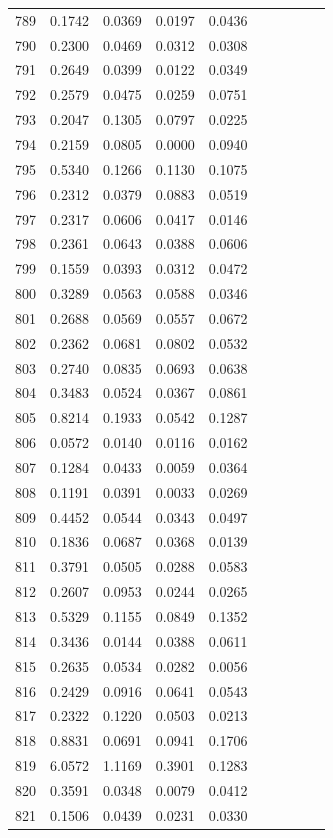 \begin{table}
\begin{tabular}{cccccccccc}
789& 0.1742& 0.0369& 0.0197& 0.0436\\ 
790& 0.2300& 0.0469& 0.0312& 0.0308\\ 
791& 0.2649& 0.0399& 0.0122& 0.0349\\ 
792& 0.2579& 0.0475& 0.0259& 0.0751\\ 
793& 0.2047& 0.1305& 0.0797& 0.0225\\ 
794& 0.2159& 0.0805& 0.0000& 0.0940\\ 
795& 0.5340& 0.1266& 0.1130& 0.1075\\ 
796& 0.2312& 0.0379& 0.0883& 0.0519\\ 
797& 0.2317& 0.0606& 0.0417& 0.0146\\ 
798& 0.2361& 0.0643& 0.0388& 0.0606\\ 
799& 0.1559& 0.0393& 0.0312& 0.0472\\ 
800& 0.3289& 0.0563& 0.0588& 0.0346\\ 
801& 0.2688& 0.0569& 0.0557& 0.0672\\ 
802& 0.2362& 0.0681& 0.0802& 0.0532\\ 
803& 0.2740& 0.0835& 0.0693& 0.0638\\ 
804& 0.3483& 0.0524& 0.0367& 0.0861\\ 
805& 0.8214& 0.1933& 0.0542& 0.1287\\ 
806& 0.0572& 0.0140& 0.0116& 0.0162\\ 
807& 0.1284& 0.0433& 0.0059& 0.0364\\ 
808& 0.1191& 0.0391& 0.0033& 0.0269\\ 
809& 0.4452& 0.0544& 0.0343& 0.0497\\ 
810& 0.1836& 0.0687& 0.0368& 0.0139\\ 
811& 0.3791& 0.0505& 0.0288& 0.0583\\ 
812& 0.2607& 0.0953& 0.0244& 0.0265\\ 
813& 0.5329& 0.1155& 0.0849& 0.1352\\ 
814& 0.3436& 0.0144& 0.0388& 0.0611\\ 
815& 0.2635& 0.0534& 0.0282& 0.0056\\ 
816& 0.2429& 0.0916& 0.0641& 0.0543\\ 
817& 0.2322& 0.1220& 0.0503& 0.0213\\ 
818& 0.8831& 0.0691& 0.0941& 0.1706\\ 
819& 6.0572& 1.1169& 0.3901& 0.1283\\ 
820& 0.3591& 0.0348& 0.0079& 0.0412\\ 
821& 0.1506& 0.0439& 0.0231& 0.0330\\ 

\end{tabular}
\end{table}
